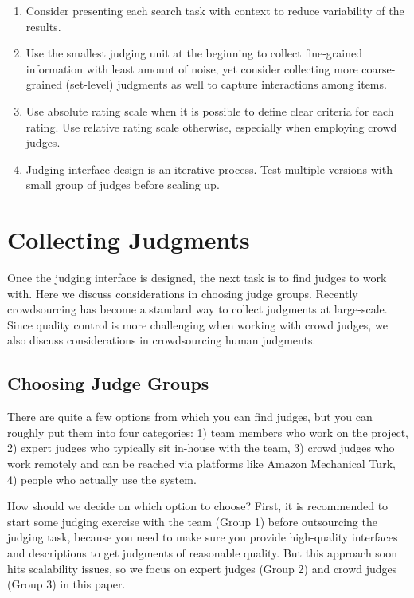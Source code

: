 \begin{enumerate}
	\item Consider presenting each search task with context to reduce variability of the results.
	\item Use the smallest judging unit at the beginning to collect fine-grained information with least amount of noise, yet consider collecting more coarse-grained (set-level) judgments as well to capture interactions among items.
	\item Use absolute rating scale when it is possible to define clear criteria for each rating. Use relative rating scale otherwise, especially when employing crowd judges.
	\item Judging interface design is an iterative process. Test multiple versions with small group of judges before scaling up.
\end{enumerate}


\section{Collecting Judgments}

Once the judging interface is designed, the next task is to find judges to work with. Here we discuss considerations in choosing judge groups. Recently crowdsourcing has become a standard way to collect judgments at large-scale. Since quality control is more challenging when working with crowd judges, we also discuss considerations in crowdsourcing human judgments. 


\subsection{Choosing Judge Groups}
There are quite a few options from which you can find judges, but you can roughly put them into four categories: 1) team members who work on the project, 2) expert judges who typically sit in-house with the team, 3) crowd judges who work remotely and can be reached via platforms like Amazon Mechanical Turk, 4) people who actually use the system. %

How should we decide on which option to choose? First, it is recommended to start some judging exercise with the team (Group 1) before outsourcing the judging task, because you need to make sure you provide high-quality interfaces and descriptions to get judgments of reasonable quality. But this approach soon hits scalability issues, so we focus on expert judges (Group 2) and crowd judges (Group 3) in this paper.

